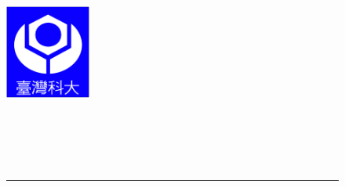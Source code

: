 
\newcommand\itsempty{}
%
\begin{titlepage}

\begin{center}
%



\begin{figure}[htbp]
	\begin{minipage}[b]{5cm} 
		\raggedright
		\includegraphics[width=1.1in]{frontpages/ntust_logo.eps}
		\label{fig:ntust_logo}
	\end{minipage}%
	\begin{minipage}[b]{0.5\textwidth} 
	\centering
	\makebox[3cm][c]{\Huge{\univCname}}\\  %
	\vspace{0.5cm}
	\makebox[3cm][c]{\Huge{\deptCname}}\\ %
	\vspace{0.5cm}
	\end{minipage}%
\\ 
\rule{16cm}{3pt}
\end{figure}



\end{center}
\end{titlepage}
